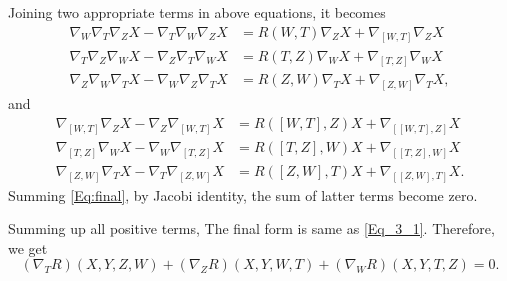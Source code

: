 \documentclass[a4paper, 12pt]{article}
\theoremstyle{Mydefinition}
\theoremstyle{Mytheorem}
\begin{document}
Joining two appropriate terms in above equations, it becomes
\begin{equation}
\begin{split}
    \nabla_W\nabla_T\nabla_Z X - \nabla_T\nabla_W\nabla_Z X &= R(W,T)\nabla_Z X + \nabla_{[W,T]}\nabla_Z X\\
    \nabla_T\nabla_Z\nabla_W X - \nabla_Z\nabla_T\nabla_W X &= R(T,Z)\nabla_W X + \nabla_{[T,Z]}\nabla_W X\\
    \nabla_Z\nabla_W\nabla_T X - \nabla_W\nabla_Z\nabla_T X &= R(Z,W)\nabla_T X + \nabla_{[Z,W]}\nabla_T X,
\end{split}
\end{equation}
and
\begin{equation}\label{Eq:final}
\begin{split}
    \nabla_{[W,T]}\nabla_Z X - \nabla_Z\nabla_{[W,T]} X &= R([W,T],Z)X + \nabla_{[[W,T],Z]}X\\
    \nabla_{[T,Z]}\nabla_W X - \nabla_W\nabla_{[T,Z]} X &= R([T,Z],W)X + \nabla_{[[T,Z],W]}X\\
    \nabla_{[Z,W]}\nabla_T X - \nabla_T\nabla_{[Z,W]} X &= R([Z,W], T)X + \nabla_{[[Z,W],T]}X.
\end{split}
\end{equation}
Summing \eqref{Eq:final}, by Jacobi identity, the sum of latter terms become zero.

Summing up all positive terms, The final form is same as \eqref{Eq_3_1}. Therefore, we get
\begin{equation}
     (\nabla_T R)(X,Y,Z,W)+(\nabla_Z R)(X,Y,W,T)+(\nabla_W R)(X,Y,T,Z)=0.
\end{equation}

\end{document}
